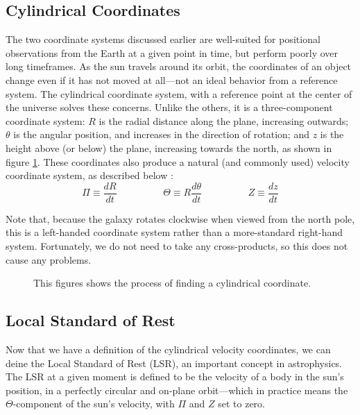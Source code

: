 \documentclass[12pt,twoside]{reedthesis}
\begin{document}
\subsection*{Cylindrical Coordinates}

The two coordinate systems discussed earlier are well-suited for positional observations from the Earth at a given point in time, but perform poorly over long timeframes. As the sun travels around its orbit, the coordinates of an object change even if it has not moved at all---not an ideal behavior from a reference system. The cylindrical coordinate system, with a reference point at the center of the universe solves these concerns. Unlike the others, it is a three-component coordinate system: $R$ is the radial distance along the plane, increasing outwards; $\theta$ is the angular position, and increases in the direction of rotation; and $z$ is the height above (or below) the plane, increasing towards the north, as shown in figure \ref{cylindrical-coords}. These coordinates also produce a natural (and commonly used) velocity coordinate system, as described below \citep{modern-astrophysics}:
\begin{equation}
    \Pi \equiv \frac{dR}{dt} \hspace{2cm} \Theta \equiv R\frac{d\theta}{dt} \hspace{2cm} Z \equiv \frac{dz}{dt}
\end{equation}

Note that, because the galaxy rotates clockwise when viewed from the north pole, this is a left-handed coordinate system rather than a more-standard right-hand system. Fortunately, we do not need to take any cross-products, so this does not cause any problems.

\begin{figure}[p]
    \caption{This figures shows the process of finding a cylindrical coordinate.}
    \label{cylindrical-coords}
\end{figure}

\subsection*{Local Standard of Rest}

Now that we have a definition of the cylindrical velocity coordinates, we can deine the Local Standard of Rest (LSR), an important concept in astrophysics. The LSR at a given moment is defined to be the velocity of a body in the sun's position, in a perfectly circular and on-plane orbit---which in practice means the $\Theta$-component of the sun's velocity, with $\Pi$ and $Z$ set to zero.
\end{document}
